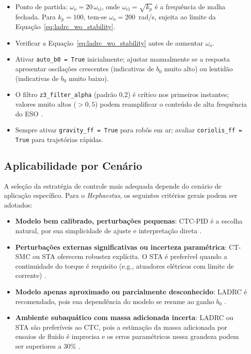 \begin{itemize}
    \item Ponto de partida: $\omega_o = 20\,\omega_{\text{cl}}$, onde $\omega_{\text{cl}} = \sqrt{k_p}$ é a frequência de malha fechada. Para $k_p = 100$, tem-se $\omega_o = 200$~rad/s, sujeita ao limite da Equação~\eqref{eq:ladrc_wo_stability}.
    \item Verificar a Equação~\eqref{eq:ladrc_wo_stability} antes de aumentar $\omega_o$.
    \item Ativar \texttt{auto\_b0 = True} inicialmente; ajustar manualmente se a resposta apresentar oscilações crescentes (indicativas de $b_0$ muito alto) ou lentidão (indicativas de $b_0$ muito baixo).
    \item O filtro \texttt{z3\_filter\_alpha} (padrão 0,2) é crítico nos primeiros instantes; valores muito altos ($> 0,5$) podem reamplificar o conteúdo de alta frequência do ESO \cite{han2009pid}.
    \item Sempre ativar \texttt{gravity\_ff = True} para robôs em ar; avaliar \texttt{coriolis\_ff = True} para trajetórias rápidas.
\end{itemize}

\subsection{Aplicabilidade por Cenário}

A seleção da estratégia de controle mais adequada depende do cenário de aplicação específico. Para o \textit{Hephaestus}, os seguintes critérios gerais podem ser adotados:

\begin{itemize}
    \item \textbf{Modelo bem calibrado, perturbações pequenas}: CTC-PID é a escolha natural, por sua simplicidade de ajuste e interpretação direta \cite{craig1989introduction, spong2020robot}.
    \item \textbf{Perturbações externas significativas ou incerteza paramétrica}: CT-SMC ou STA oferecem robustez explícita. O STA é preferível quando a continuidade do torque é requisito (e.g., atuadores elétricos com limite de corrente) \cite{levant1993sliding, shtessel2014sliding}.
    \item \textbf{Modelo apenas aproximado ou parcialmente desconhecido}: LADRC é recomendado, pois sua dependência do modelo se resume ao ganho $b_0$ \cite{gao2003scaling, huang2014active, madonski2019general}.
    \item \textbf{Ambiente subaquático com massa adicionada incerta}: LADRC ou STA são preferíveis ao CTC, pois a estimação da massa adicionada por ensaios de fluido é imprecisa e os erros paramétricos nessa grandeza podem ser superiores a 30\% \cite{fossen2011handbook, antonelli2014modelling}.
\end{itemize}

